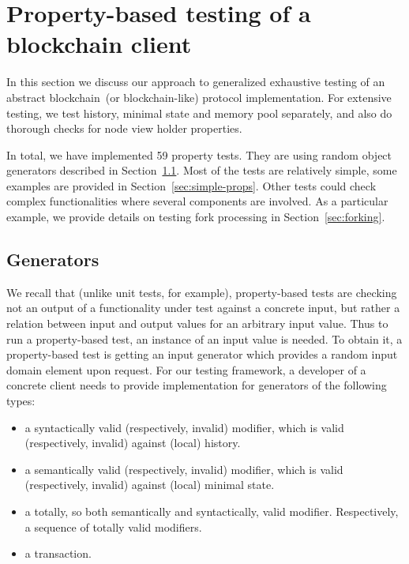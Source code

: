 
\section{Property-based testing of a blockchain client}
\label{sec:props}

In this section we discuss our approach to generalized exhaustive testing of an abstract blockchain~(or blockchain-like) protocol implementation. For extensive testing, we test history, minimal state and memory pool separately, and also do thorough checks for node view holder properties.
	
In total, we have implemented 59 property tests. They are using random object generators described in Section~\ref{sec:generators}. Most of the tests are relatively simple, some examples are provided in Section~\ref{sec:simple-props}. Other tests could check complex functionalities where several components are involved. As a particular example, we provide details on testing fork processing in Section~\ref{sec:forking}.

\subsection{Generators}
\label{sec:generators}

We recall that (unlike unit tests, for example), property-based tests are checking not an output of a functionality under test against a concrete input, but rather a relation between input and output values for an arbitrary input value. Thus to run a property-based test, an instance of an input value is needed. To obtain it, a property-based test is getting an input generator which provides a random input domain element upon request. For our testing framework, a developer of a concrete client needs to provide implementation for generators of the following types:

\begin{itemize}
	\item{a syntactically valid (respectively, invalid) modifier, which is valid (respectively, invalid) against (local) history.}
	\item{a semantically valid (respectively, invalid) modifier, which is valid (respectively, invalid) against (local) minimal state.}
	\item{a totally, so both semantically and syntactically, valid modifier. Respectively, a sequence of totally valid modifiers.}
	\item{a transaction.}
\end{itemize}

